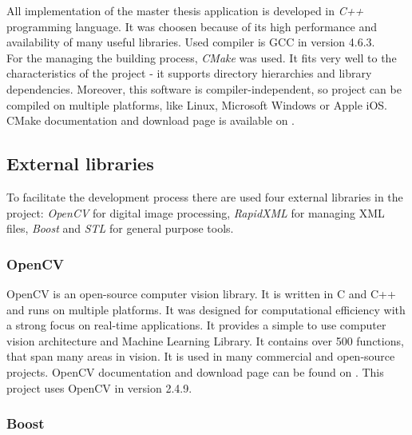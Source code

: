 \documentclass[a4paper,onecolumn,oneside,12pt]{memoir}
\begin{document}
All implementation of the master thesis application is developed in \textit{C++} programming 
language. It was choosen because of its high performance and availability of many useful libraries.
Used compiler is GCC in version 4.6.3. \\

For the managing the building process, \textit{CMake} was used. It fits very well to the
characteristics of the project - it supports directory hierarchies and library dependencies.
Moreover, this software is compiler-independent, so project can be compiled on multiple platforms,
like Linux, Microsoft Windows or Apple iOS. CMake documentation and download page is available on
\cite{cmakeMainPage}.

\subsection{External libraries}
\label{externalLibrariesSection}
To facilitate the development process there are used four external libraries in the project:
\textit{OpenCV} for digital image processing, \textit{RapidXML} for managing XML files,
\textit{Boost} and \textit{STL} for general purpose tools.

\subsubsection{OpenCV}

OpenCV \cite{learningOpenCv} is an open-source computer vision library. It is written
in C and C++ and runs on multiple platforms. It was designed for computational efficiency with a
strong focus on real-time applications. It provides a simple to use computer vision architecture
and Machine Learning Library. It contains over 500 functions, that span many areas in vision. It is
used in many commercial and open-source projects. OpenCV documentation and download page can be
found on \cite{opencvMainPage}. This project uses OpenCV in version 2.4.9.

\subsubsection{Boost}
\end{document}
